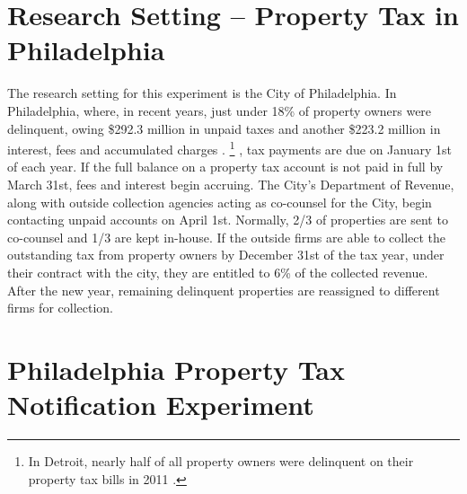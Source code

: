 \documentclass[12pt,titlepage]{article}
\begin{document}
\section{Research Setting -- Property Tax in Philadelphia}

The research setting for this experiment is the City of
Philadelphia. In Philadelphia, where, in recent years, just under
18\% of property owners were delinquent, owing 
\$292.3 million in unpaid taxes and another \$223.2 million in interest,
fees and accumulated charges \citep{pew}.
\footnote{
	In Detroit, nearly half of all property owners were delinquent
    on their property tax bills in 2011 \citep{macdonald}.
}
, tax payments are due on January 1st of each year. If the full balance on a
property tax account is not paid in full by March 31st, fees and interest
begin accruing. The City’s Department of Revenue, along with outside
collection agencies acting as co-counsel for the City, begin contacting
unpaid accounts on April 1st. Normally, 2/3 of properties are sent to
co-counsel and 1/3 are kept in-house. If the outside firms are able to
collect the outstanding tax from property owners by December 31st of the
tax year, under their contract with the city, they are entitled to 6\% of
the collected revenue. After the new year, remaining delinquent properties
are reassigned to different firms for collection.

\section{Philadelphia Property Tax Notification Experiment}
\end{document}
